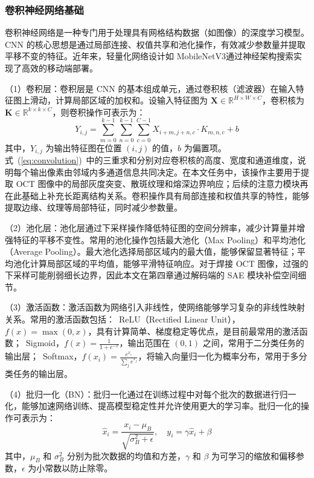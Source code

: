 \subsubsection{卷积神经网络基础}

卷积神经网络是一种专门用于处理具有网格结构数据（如图像）的深度学习模型。CNN 的核心思想是通过局部连接、权值共享和池化操作，有效减少参数量并提取平移不变的特征。近年来，轻量化网络设计如 MobileNetV3通过神经架构搜索实现了高效的移动端部署。

（1）卷积层：卷积层是 CNN 的基本组成单元，通过卷积核（滤波器）在输入特征图上滑动，计算局部区域的加权和。设输入特征图为 $\mathbf{X} \in \mathbb{R}^{H \times W \times C}$，卷积核为 $\mathbf{K} \in \mathbb{R}^{k \times k \times C}$，则卷积操作可表示为：
\begin{equation}
Y_{i,j} = \sum_{m=0}^{k-1} \sum_{n=0}^{k-1} \sum_{c=0}^{C-1} X_{i+m,j+n,c} \cdot K_{m,n,c} + b
\label{eq:convolution}
\end{equation}
其中，$Y_{i,j}$ 为输出特征图在位置 $(i,j)$ 的值，$b$ 为偏置项。式~(\ref{eq:convolution})~中的三重求和分别对应卷积核的高度、宽度和通道维度，说明每个输出像素由邻域内多通道信息共同决定。在本文任务中，该操作主要用于提取 OCT 图像中的局部灰度突变、散斑纹理和熔深边界响应；后续的注意力模块再在此基础上补充长距离结构关系。卷积操作具有局部连接和权值共享的特性，能够提取边缘、纹理等局部特征，同时减少参数量。

（2）池化层：池化层通过下采样操作降低特征图的空间分辨率，减少计算量并增强特征的平移不变性。常用的池化操作包括最大池化（Max Pooling）和平均池化（Average Pooling）。最大池化选择局部区域内的最大值，能够保留显著特征；平均池化计算局部区域的平均值，能够平滑特征响应。对于焊接 OCT 图像，过强的下采样可能削弱细长边界，因此本文在第四章通过解码端的 SAE 模块补偿空间细节。

（3）激活函数：激活函数为网络引入非线性，使网络能够学习复杂的非线性映射关系。常用的激活函数包括：~ReLU（Rectified Linear Unit），$f(x) = \max(0, x)$，具有计算简单、梯度稳定等优点，是目前最常用的激活函数；~Sigmoid，$f(x) = \frac{1}{1+e^{-x}}$，输出范围在 $(0,1)$ 之间，常用于二分类任务的输出层；~Softmax，$f(x_i) = \frac{e^{x_i}}{\sum_{j} e^{x_j}}$，将输入向量归一化为概率分布，常用于多分类任务的输出层。

（4）批归一化（BN）：批归一化通过在训练过程中对每个批次的数据进行归一化，能够加速网络训练、提高模型稳定性并允许使用更大的学习率。批归一化的操作可表示为：
\begin{equation}
\hat{x}_i = \frac{x_i - \mu_B}{\sqrt{\sigma_B^2 + \epsilon}}, \quad y_i = \gamma \hat{x}_i + \beta
\label{eq:batch_norm}
\end{equation}
其中，$\mu_B$ 和 $\sigma_B^2$ 分别为批次数据的均值和方差，$\gamma$ 和 $\beta$ 为可学习的缩放和偏移参数，$\epsilon$ 为小常数以防止除零。

